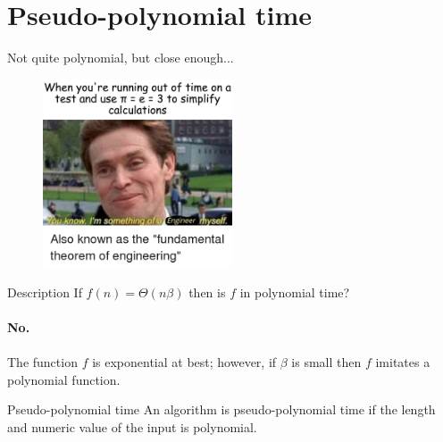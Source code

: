 \documentclass{cspresentation}
\begin{document}
\section{Pseudo-polynomial time}
\begin{frame}[fragile]{Not quite polynomial, but close enough...}
    \begin{figure}
        \centering
        \includegraphics[width=0.5\textwidth]{lessons/images/fundemental_theorem_of_engineering.png}
    \end{figure}
\end{frame}
\begin{frame}{Description}
    If $f(n)=\Theta\left(n\beta\right)$ then is $f$ in polynomial time?\\~\\
    {\Huge\textbf{No.}}\\~\\
    The function $f$ is exponential at best; however, if $\beta$ is small then $f$ imitates a polynomial function.
    \begin{block}{Pseudo-polynomial time}
        An algorithm is pseudo-polynomial time if the length and numeric value of the input is polynomial.
    \end{block}
\end{frame}
\end{document}
